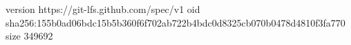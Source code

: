 version https://git-lfs.github.com/spec/v1
oid sha256:155b0ad06bdc15b5b360f6f702ab722b4bdc0d8325cb070b0478d4810f3fa770
size 349692
